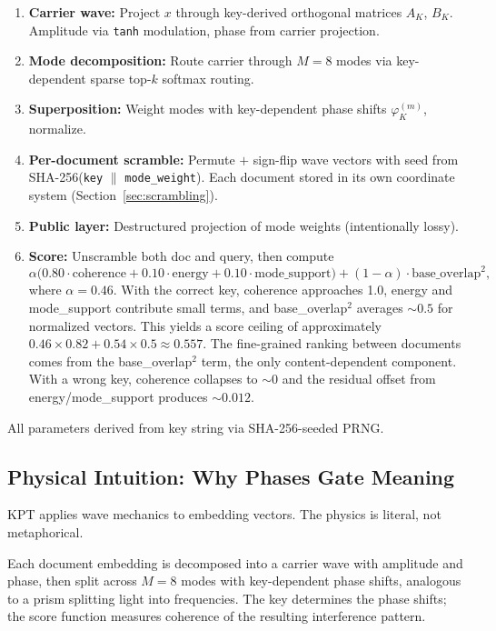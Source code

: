 \documentclass{article}
\begin{document}
\begin{enumerate}[nosep]
  \item \textbf{Carrier wave:} Project $x$ through key-derived orthogonal matrices $A_K$, $B_K$. Amplitude via \texttt{tanh} modulation, phase from carrier projection.
  \item \textbf{Mode decomposition:} Route carrier through $M{=}8$ modes via key-dependent sparse top-$k$ softmax routing.
  \item \textbf{Superposition:} Weight modes with key-dependent phase shifts $\varphi_K^{(m)}$, normalize.
  \item \textbf{Per-document scramble:} Permute $+$ sign-flip wave vectors with seed from SHA-256(\texttt{key} $\|$ \texttt{mode\_weight}). Each document stored in its own coordinate system (Section~\ref{sec:scrambling}).
  \item \textbf{Public layer:} Destructured projection of mode weights (intentionally lossy).
  \item \textbf{Score:} Unscramble both doc and query, then compute
    \[
      \alpha\bigl(0.80\cdot\mathrm{coherence} + 0.10\cdot\mathrm{energy} + 0.10\cdot\mathrm{mode\_support}\bigr) + (1-\alpha)\cdot\mathrm{base\_overlap}^2,
    \]
    where $\alpha=0.46$. With the correct key, coherence approaches 1.0, energy and mode\_support contribute small terms, and base\_overlap$^2$ averages ${\sim}0.5$ for normalized vectors. This yields a score ceiling of approximately $0.46 \times 0.82 + 0.54 \times 0.5 \approx 0.557$. The fine-grained ranking between documents comes from the base\_overlap$^2$ term, the only content-dependent component. With a wrong key, coherence collapses to ${\sim}0$ and the residual offset from energy/mode\_support produces ${\sim}0.012$.
\end{enumerate}

All parameters derived from key string via SHA-256-seeded PRNG.

\subsection{Physical Intuition: Why Phases Gate Meaning}

KPT applies wave mechanics to embedding vectors. The physics is literal, not metaphorical.

Each document embedding is decomposed into a carrier wave with amplitude and phase, then split across $M{=}8$ modes with key-dependent phase shifts, analogous to a prism splitting light into frequencies.
The key determines the phase shifts; the score function measures coherence of the resulting interference pattern.
\end{document}

